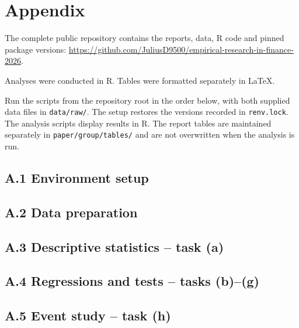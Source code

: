 \begingroup
\singlespacing
\setlength{\parindent}{0pt}
\setlength{\parskip}{0.5\baselineskip}

\section*{Appendix}

The complete public repository contains the reports, data, R code and pinned package versions:
\url{https://github.com/JuliusD9500/empirical-research-in-finance-2026}.

Analyses were conducted in R. Tables were formatted separately in LaTeX.

Run the scripts from the repository root in the order below, with both supplied data files in \texttt{data/raw/}. The setup restores the versions recorded in \texttt{renv.lock}. The analysis scripts display results in R. The report tables are maintained separately in \texttt{paper/group/tables/} and are not overwritten when the analysis is run.

\setlength{\parskip}{0pt}

\subsection*{A.1 Environment setup}


\clearpage
\subsection*{A.2 Data preparation}


\clearpage
\subsection*{A.3 Descriptive statistics -- task (a)}


\clearpage
\subsection*{A.4 Regressions and tests -- tasks (b)--(g)}


\clearpage
\subsection*{A.5 Event study -- task (h)}


\endgroup
